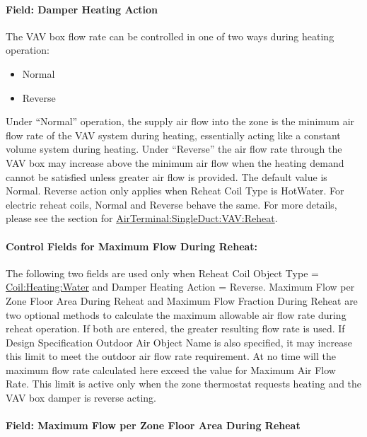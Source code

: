 \paragraph{Field: Damper Heating Action}\label{field-damper-heating-action-000}

The VAV box flow rate can be controlled in one of two ways during heating operation:

\begin{itemize}
\item
  Normal
\item
  Reverse
\end{itemize}

Under ``Normal'' operation, the supply air flow into the zone is the minimum air flow rate of the VAV system during heating, essentially acting like a constant volume system during heating. Under ``Reverse'' the air flow rate through the VAV box may increase above the minimum air flow when the heating demand cannot be satisfied unless greater air flow is provided. The default value is Normal. Reverse action only applies when Reheat Coil Type is HotWater. For electric reheat coils, Normal and Reverse behave the same. For more details, please see the section for \hyperref[airterminalsingleductvavreheat]{AirTerminal:SingleDuct:VAV:Reheat}.

\paragraph{Control Fields for Maximum Flow During Reheat:}\label{control-fields-for-maximum-flow-during-reheat-000}

The following two fields are used only when Reheat Coil Object Type = \hyperref[coilheatingwater]{Coil:Heating:Water} and Damper Heating Action = Reverse. Maximum Flow per Zone Floor Area During Reheat and Maximum Flow Fraction During Reheat are two optional methods to calculate the maximum allowable air flow rate during reheat operation. If both are entered, the greater resulting flow rate is used. If Design Specification Outdoor Air Object Name is also specified, it may increase this limit to meet the outdoor air flow rate requirement. At no time will the maximum flow rate calculated here exceed the value for Maximum Air Flow Rate. This limit is active only when the zone thermostat requests heating and the VAV box damper is reverse acting.

\paragraph{Field: Maximum Flow per Zone Floor Area During Reheat}\label{field-maximum-flow-per-zone-floor-area-during-reheat-000}


